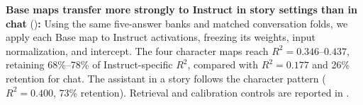 \noindent\textbf{Base maps transfer more strongly to Instruct in story settings than in chat} ()\textbf{:}
Using the same five-answer banks and matched conversation folds, we apply each Base map to Instruct activations, freezing its weights, input normalization, and intercept.
The four character maps reach $R^2=0.346$--$0.437$, retaining 68\%--78\% of Instruct-specific $R^2$, compared with $R^2=0.177$ and 26\% retention for chat.
The assistant in a story follows the character pattern ($R^2=0.400$, 73\% retention).
Retrieval and calibration controls are reported in .
